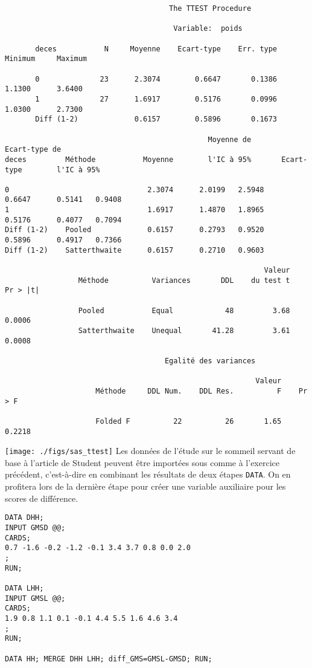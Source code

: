 \begin{verbatim}
                                      The TTEST Procedure

                                       Variable:  poids

       deces           N     Moyenne    Ecart-type    Err. type     Minimum     Maximum

       0              23      2.3074        0.6647       0.1386      1.1300      3.6400
       1              27      1.6917        0.5176       0.0996      1.0300      2.7300
       Diff (1-2)             0.6157        0.5896       0.1673

                                               Moyenne de                       Ecart-type de
deces         Méthode           Moyenne        l'IC à 95%       Ecart-type        l'IC à 95%

0                                2.3074      2.0199   2.5948        0.6647      0.5141   0.9408
1                                1.6917      1.4870   1.8965        0.5176      0.4077   0.7094
Diff (1-2)    Pooled             0.6157      0.2793   0.9520        0.5896      0.4917   0.7366
Diff (1-2)    Satterthwaite      0.6157      0.2710   0.9603

                                                            Valeur
                 Méthode          Variances       DDL    du test t    Pr > |t|

                 Pooled           Equal            48         3.68      0.0006
                 Satterthwaite    Unequal       41.28         3.61      0.0008

                                     Egalité des variances

                                                          Valeur
                     Méthode     DDL Num.    DDL Res.          F    Pr > F

                     Folded F          22          26       1.65    0.2218
\end{verbatim}

\texttt{[image: ./figs/sas\_ttest]}
%
%
%
\soln{\ref{exo:9.2}}
Les données de l'étude sur le sommeil servant de base à
l'article de Student peuvent être importées sous \SAS comme à l'exercice
précédent, c'est-à-dire en combinant les résultats de deux étapes
\texttt{DATA}. On en profitera lors de la dernière étape pour créer une
variable auxiliaire pour les scores de différence.
\begin{verbatim}
DATA DHH;
INPUT GMSD @@;
CARDS;
0.7 -1.6 -0.2 -1.2 -0.1 3.4 3.7 0.8 0.0 2.0
;
RUN;

DATA LHH;
INPUT GMSL @@;
CARDS;
1.9 0.8 1.1 0.1 -0.1 4.4 5.5 1.6 4.6 3.4
;
RUN;

DATA HH; MERGE DHH LHH; diff_GMS=GMSL-GMSD; RUN;
\end{verbatim}

